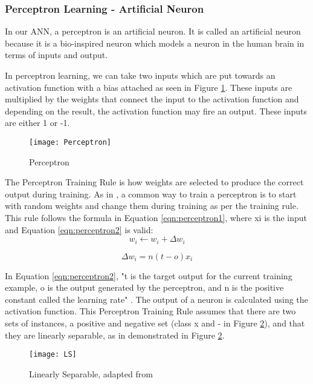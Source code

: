 \tocless\subsubsection{Perceptron Learning - Artificial Neuron}
In our ANN, a perceptron is an artificial neuron.
It is called an artificial neuron because it is a bio-inspired neuron which models
a neuron in the human brain in terms of inputs and output.

In perceptron learning, we can take two inputs which are put towards an
activation function with a bias attached as seen in Figure \ref{fig:perceptron}.
These inputs are multiplied by the weights that connect the input to the
activation function and depending on the result, the activation function may
fire an output. These inputs are either 1 or -1.

\begin{figure}[h]
	\centering
     \texttt{[image: Perceptron]}
     \caption{Perceptron}
     \label{fig:perceptron}
\end{figure}

The Perceptron Training Rule is how weights are selected to produce the correct output during training.
As in \parencite{MLANN}, a common way to train a perceptron is to start with random weights and change them during training as per the training rule.
This rule follows the formula in Equation \ref{eqn:perceptron1}, where xi is the input and Equation \ref{eqn:perceptron2} is valid:
\begin{equation}\label{eqn:perceptron1}
    w_{i} \leftarrow w_{i} + \Delta w_{i}
\end{equation}

\begin{equation}\label{eqn:perceptron2}
    \Delta w_{i} = n(t-o)x_{i}
\end{equation}

In Equation \ref{eqn:perceptron2}, "t is the target output for the current training example, o is the output generated by the perceptron, and n is the positive constant called the learning rate" \parencite{MLANN}.
The output of a neuron is calculated using the activation function.
This Perceptron Training Rule assumes that there are two sets of instances, a
positive and negative set (class x and - in Figure \ref{fig:ls}), and that they are linearly separable, as in demonstrated in Figure \ref{fig:ls}. 

\begin{figure}[h]
	\centering
    \texttt{[image: LS]}
     \caption{Linearly Separable, adapted from \parencite{MLANN}}
     \label{fig:ls}
\end{figure}

